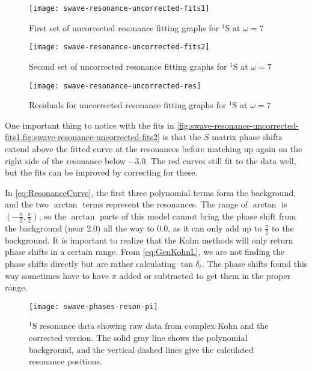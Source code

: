 \documentclass[Dissertation.tex]{subfiles}
\begin{document}
\begin{figure}[H]
	\centering
	\texttt{[image: swave-resonance-uncorrected-fits1]}
	\caption{First set of uncorrected resonance fitting graphs for $^1$S at $\omega = 7$}
	\label{fig:swave-resonance-uncorrected-fits1}
\end{figure}

\begin{figure}[H]
	\centering
	\texttt{[image: swave-resonance-uncorrected-fits2]}
	\caption{Second set of uncorrected resonance fitting graphs for $^1$S at $\omega = 7$}
	\label{fig:swave-resonance-uncorrected-fits2}
\end{figure}

\begin{figure}[H]
	\centering
	\texttt{[image: swave-resonance-uncorrected-res]}
	\caption{Residuals for uncorrected resonance fitting graphs for $^1$S at $\omega = 7$}
	\label{fig:swave-resonance-uncorrected-res}
\end{figure}

One important thing to notice with the fits in \cref{fig:swave-resonance-uncorrected-fits1,fig:swave-resonance-uncorrected-fits2} is that the $S$ matrix phase shifts extend above the fitted curve at the resonances before matching up again on the right side of the resonance below $-3.0$. The red curves still fit to the data well, but the fits can be improved by correcting for these. 

In \cref{eq:ResonanceCurve}, the first three polynomial terms form the background, and the two $\arctan$ terms represent the resonances. The range of $\arctan$ is $(-\frac{\pi}{2},\frac{\pi}{2})$, so the $\arctan$ parts of this model cannot bring the phase shift from the background (near 2.0) all the way to 0.0, as it can only add up to $\frac{\pi}{2}$ to the background. It is important to realize that the Kohn methods will only return phase shifts in a certain range. From \cref{eq:GenKohnL}, we are not finding the phase shifts directly but are rather calculating $\tan \delta_\ell$. The phase shifts found this way sometimes have to have $\pi$ added or subtracted to get them in the proper range.

\begin{figure}[H]
	\centering
	\texttt{[image: swave-phases-reson-pi]}
	\caption[$^1$S resonance data showing correction]{$^1$S resonance data showing raw data from complex Kohn and the corrected version. The solid gray line shows the polynomial background, and the vertical dashed lines give the calculated resonance positions.}
	\label{fig:swave-phases-reson-pi}
\end{figure}
\end{document}
